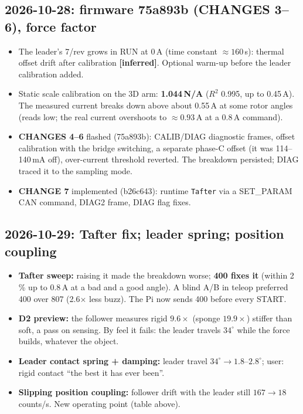\documentclass[11pt,a4paper]{article}
\newcommand{\A}{\,\mathrm{A}}
\newcommand{\inferred}{\textcolor{orange!80!black}{\textbf{[inferred]}}}
\begin{document}
\subsection*{2026-10-28: firmware 75a893b (CHANGES 3--6), force factor}
\begin{itemize}
  \item The leader's 7/rev grows in RUN at 0\,A (time constant
        $\approx 160$\,s): thermal offset drift after calibration
        \inferred. Optional warm-up before the leader calibration added.
  \item Static scale calibration on the 3D arm: \textbf{1.044\,N/A}
        ($R^2$ 0.995, up to 0.45\,A). The measured current breaks down above
        about 0.55\,A at some rotor angles (reads low; the real current
        overshoots to $\approx 0.93\A$ at a 0.8\,A command).
  \item \textbf{CHANGES 4--6} flashed (75a893b): CALIB/DIAG diagnostic
        frames, offset calibration with the bridge switching, a separate
        phase-C offset (it was 114--140\,mA off), over-current threshold
        reverted. The breakdown persisted; DIAG traced it to the sampling
        mode.
  \item \textbf{CHANGE 7} implemented (b26c643): runtime \texttt{Tafter}
        via a SET\_PARAM CAN command, DIAG2 frame, DIAG flag fixes.
\end{itemize}

\subsection*{2026-10-29: Tafter fix; leader spring; position coupling}
\begin{itemize}
  \item \textbf{Tafter sweep:} raising it made the breakdown worse;
        \textbf{400 fixes it} (within 2\,\% up to 0.8\,A at a bad and a good
        angle). A blind A/B in teleop preferred 400 over 807 (2.6$\times$
        less buzz). The Pi now sends 400 before every START.
  \item \textbf{D2 preview:} the follower measures rigid $9.6\times$ (sponge
        $19.9\times$) stiffer than soft, a pass on sensing. By feel it fails:
        the leader travels $34^\circ$ while the force builds, whatever the
        object.
  \item \textbf{Leader contact spring + damping:} leader travel
        $34^\circ \to 1.8$--$2.8^\circ$; user: rigid contact ``the best it
        has ever been''.
  \item \textbf{Slipping position coupling:} follower drift with the leader
        still $167 \to 18$ counts/s. New operating point (table above).
\end{itemize}
\end{document}
